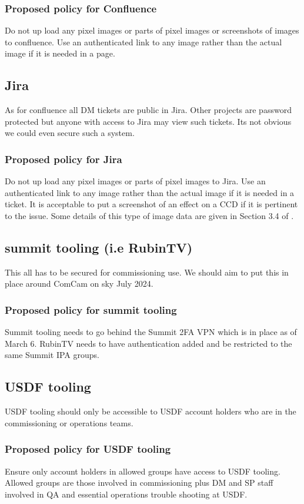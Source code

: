 \subsubsection{Proposed policy for Confluence}
Do not up load any pixel images or parts of pixel images or screenshots of images to confluence.
Use an authenticated link to any image rather than the actual image if it is needed in a page.




\subsection{Jira}
As for confluence all DM tickets are public in Jira.
Other projects are password protected but anyone with access to Jira may view such tickets.
Its not obvious we could even secure such a system.

\subsubsection{Proposed policy for Jira}
Do not up load any pixel images or parts of pixel images to Jira.
Use an authenticated link to any image rather than the actual image if it is needed in a ticket.
It is acceptable to put a screenshot of an effect on a CCD if it is pertinent to the issue.
Some details of this type of image data are given in Section 3.4 of .

\subsection{summit tooling (i.e RubinTV)}
This all has to be secured for commissioning use.
We should aim to put this in place around ComCam on sky July 2024.

\subsubsection{Proposed policy for summit tooling}
Summit tooling needs to go behind the Summit 2FA VPN which is in place as of March 6.
RubinTV needs to have authentication added and be restricted to the same Summit IPA groups.

\subsection{USDF tooling}
USDF tooling should only be accessible to USDF account holders who are in the commissioning or operations teams.
\subsubsection{Proposed policy for USDF tooling}
Ensure only account holders in allowed groups have access to USDF tooling.
Allowed groups are those involved in commissioning plus DM and SP staff involved in QA and essential operations trouble shooting at USDF.

